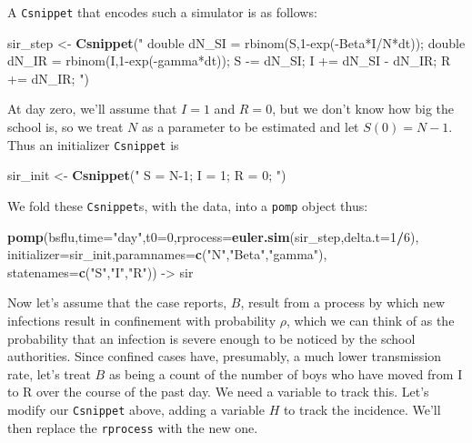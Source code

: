 \documentclass[]{article}
\newenvironment{Shaded}{\begin{snugshade}}{\end{snugshade}}
\newcommand{\KeywordTok}[1]{\textcolor[rgb]{0.13,0.29,0.53}{\textbf{#1}}}
\newcommand{\DataTypeTok}[1]{\textcolor[rgb]{0.13,0.29,0.53}{#1}}
\newcommand{\DecValTok}[1]{\textcolor[rgb]{0.00,0.00,0.81}{#1}}
\newcommand{\StringTok}[1]{\textcolor[rgb]{0.31,0.60,0.02}{#1}}
\newcommand{\OperatorTok}[1]{\textcolor[rgb]{0.81,0.36,0.00}{\textbf{#1}}}
\newcommand{\NormalTok}[1]{#1}
\begin{document}
A \texttt{Csnippet} that encodes such a simulator is as follows:

\begin{Shaded}
\begin{Highlighting}[]
\NormalTok{sir_step <-}\StringTok{ }\KeywordTok{Csnippet}\NormalTok{(}\StringTok{"}
\StringTok{  double dN_SI = rbinom(S,1-exp(-Beta*I/N*dt));}
\StringTok{  double dN_IR = rbinom(I,1-exp(-gamma*dt));}
\StringTok{  S -= dN_SI;}
\StringTok{  I += dN_SI - dN_IR;}
\StringTok{  R += dN_IR;}
\StringTok{"}\NormalTok{)}
\end{Highlighting}
\end{Shaded}

At day zero, we'll assume that \(I=1\) and \(R=0\), but we don't know
how big the school is, so we treat \(N\) as a parameter to be estimated
and let \(S(0)=N-1\). Thus an initializer \texttt{Csnippet} is

\begin{Shaded}
\begin{Highlighting}[]
\NormalTok{sir_init <-}\StringTok{ }\KeywordTok{Csnippet}\NormalTok{(}\StringTok{"}
\StringTok{  S = N-1;}
\StringTok{  I = 1;}
\StringTok{  R = 0;}
\StringTok{"}\NormalTok{)}
\end{Highlighting}
\end{Shaded}

We fold these \texttt{Csnippet}s, with the data, into a \texttt{pomp}
object thus:

\begin{Shaded}
\begin{Highlighting}[]
\KeywordTok{pomp}\NormalTok{(bsflu,}\DataTypeTok{time=}\StringTok{"day"}\NormalTok{,}\DataTypeTok{t0=}\DecValTok{0}\NormalTok{,}\DataTypeTok{rprocess=}\KeywordTok{euler.sim}\NormalTok{(sir_step,}\DataTypeTok{delta.t=}\DecValTok{1}\OperatorTok{/}\DecValTok{6}\NormalTok{),}
     \DataTypeTok{initializer=}\NormalTok{sir_init,}\DataTypeTok{paramnames=}\KeywordTok{c}\NormalTok{(}\StringTok{"N"}\NormalTok{,}\StringTok{"Beta"}\NormalTok{,}\StringTok{"gamma"}\NormalTok{),}
     \DataTypeTok{statenames=}\KeywordTok{c}\NormalTok{(}\StringTok{"S"}\NormalTok{,}\StringTok{"I"}\NormalTok{,}\StringTok{"R"}\NormalTok{)) ->}\StringTok{ }\NormalTok{sir}
\end{Highlighting}
\end{Shaded}

Now let's assume that the case reports, \(B\), result from a process by
which new infections result in confinement with probability \(\rho\),
which we can think of as the probability that an infection is severe
enough to be noticed by the school authorities. Since confined cases
have, presumably, a much lower transmission rate, let's treat \(B\) as
being a count of the number of boys who have moved from I to R over the
course of the past day. We need a variable to track this. Let's modify
our \texttt{Csnippet} above, adding a variable \(H\) to track the
incidence. We'll then replace the \texttt{rprocess} with the new one.
\end{document}
